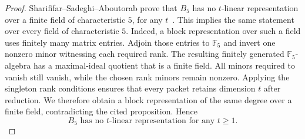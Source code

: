 \documentclass[11pt]{article}
\theoremstyle{definition}
\begin{document}
\begin{proof}
Sharififar--Sadeghi--Aboutorab prove that $B_5$ has no $t$-linear representation over a finite field of characteristic $5$, for any $t$~\cite[Proposition~7]{SharififarEtAl2024}.  This implies the same statement over every field of characteristic $5$.  Indeed, a block representation over such a field uses finitely many matrix entries.  Adjoin those entries to $\mathbb F_5$ and invert one nonzero minor witnessing each required rank.  The resulting finitely generated $\mathbb F_5$-algebra has a maximal-ideal quotient that is a finite field.  All minors required to vanish still vanish, while the chosen rank minors remain nonzero.  Applying the singleton rank conditions ensures that every packet retains dimension $t$ after reduction.  We therefore obtain a block representation of the same degree over a finite field, contradicting the cited proposition.  Hence
\begin{equation}\label{eq:nnf5-noflin}
B_5\text{ has no $t$-linear representation for any }t\ge1.
\end{equation}


\end{proof}
\end{document}

